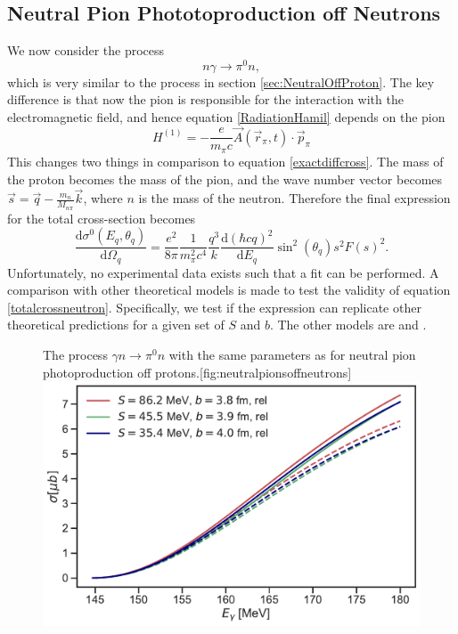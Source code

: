 \subsection{Neutral Pion Phototoproduction off Neutrons}
We now consider the process 
\begin{equation} \label{process2}
	n\gamma \rightarrow \pi^0 n,
\end{equation}
which is very similar to the process in section \ref{sec:NeutralOffProton}. The key difference is that now the pion is responsible for the interaction with the electromagnetic field, and hence equation \eqref{RadiationHamil} depends on the pion 
\begin{equation} \label{RadiNeutron}
	H^{(1)} = -\frac{e}{m_\pi c}\vec{A}(\vec{r}_\pi,t)\cdot\vec{p}_\pi	
\end{equation}
This changes two things in comparison to equation \eqref{exactdiffcross}. The mass of the proton becomes the mass of the pion, and the wave number vector becomes $\vec{s}=\vec{q}-\frac{m_n}{M_{n\pi}}\vec{k}$, where $n$ is the mass of the neutron. Therefore the final expression for the total cross-section becomes 
\begin{equation} \label{totalcrossneutron}
	\frac{\text{d}\sigma^0(E_q,\theta_q)}{\text{d}\Omega_q} = \frac{e^2}{8\pi}\frac{1}{m_\pi^2c^4}\frac{q^3}{k}\frac{\text{d}(\hbar c q)^2}{\text{d}E_q}\sin^2(\theta_q) s^2 F(s)^2.
\end{equation}
Unfortunately, no experimental data exists such that a fit can be performed. A comparison with other theoretical models is made to test the validity of equation \ref{totalcrossneutron}. Specifically, we test if the expression can replicate other theoretical predictions for a given set of $S$ and $b$. The other models are \cite{MAINZA2} and \cite{MAID2017}.
\begin{figure}[H]
    \begin{sidecaption}{The process $\gamma n \rightarrow \pi^0 n$ with the same parameters as for neutral pion photoproduction off protons.}[fig:neutralpionsoffneutrons]
    \includegraphics[width=\linewidth]{Figures/NeutralPionsOffNeutrons.pdf}
    \end{sidecaption}
\end{figure}
